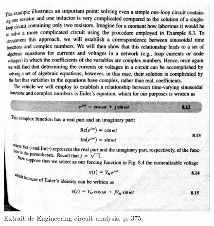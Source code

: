 \begin{figure}[h]
\begin{center}
\includegraphics[scale=0.5]{img/Irwin-1}
\end{center}
\caption{Extrait de \cite{Irwin} Engineering circuit analysis, p. 375.}%
\label{Trace 6}
\end{figure}

